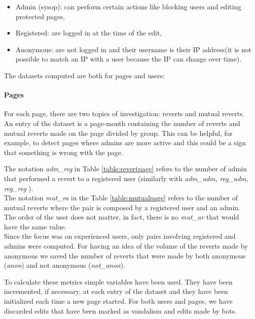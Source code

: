 \begin{itemize}
    \item Admin (sysop): can perform certain actions like blocking users and editing protected pages, 
    \item Registered: are logged in at the time of the edit, 
    \item Anonymous: are not logged in and their username is their IP address(it is not possible to match an IP with a user
        because the IP can change over time).
\end{itemize}

The datasets computed are both for pages and users: 
\paragraph*{Pages} 
For each page, there are two topics of investigation: reverts and mutual reverts. An entry of the
dataset is a page-month containing the number of reverts and mutual reverts made on the page
divided by group. This can be helpful, for example, to detect pages where admins are more active and
this could be a sign that something is wrong with the page.



The notation \textit{adm\_reg} in Table \ref{table:revertpage} refers to the number of admin that performed a
revert to a registered user (similarly with \textit{adm\_adm, reg\_adm, reg\_reg} ).\\

The notation \textit{mut\_ra} in the Table \ref{table:mutualpage} refers to the number of mutual
reverts where the pair is composed by a registered user and an admin. The order of the user does not
matter, in fact, there is no \textit{mut\_ar} that would have the same value.\\


Since the focus was on experienced users, only pairs involving registered and admins were computed.
For having an idea of the volume of the reverts made by anonymous we saved the number of reverts
that were made by both anonymous (\textit{anon}) and not anonymous (\textit{not\_anon}).

To calculate these metrics simple variables have been used. They have been incremented, if
necessary, at each entry of the dataset and they have been initialized each time a new page 
started. For both users and pages, we have discarded edits that have been marked as vandalism and
edits made by bots.


